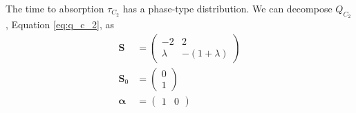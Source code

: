 The time to absorption $\tau_{C_2}$ has a phase-type distribution.
We can decompose $Q_{C_2}$, Equation \eqref{eq:q_c_2}, as
\begin{align*}
    \mathbf{S} &= \begin{pmatrix}
        -2 & 2\\
        \lambda & - (1 + \lambda)
    \end{pmatrix}\\
    \mathbf{S}_0 &= \begin{pmatrix}
        0\\
        1
    \end{pmatrix}\\
    \boldsymbol{\alpha} &= \begin{pmatrix}
    1 & 0
    \end{pmatrix}
\end{align*}

